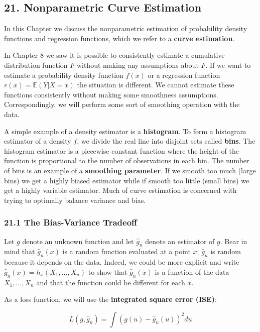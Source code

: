 \subsection{21. Nonparametric Curve Estimation}\label{nonparametric-curve-estimation}

In this Chapter we discuss the nonparametric estimation of probability
density functions and regression functions, which we refer to a
\textbf{curve estimation}.

In Chapter 8 we saw it is possible to consistently estimate a cumulative
distribution function \(F\) without making any assumptions about \(F\).
If we want to estimate a probability density function \(f(x)\) or a
regression function \(r(x) = \mathbb{E}(Y | X = x)\) the situation is
different. We cannot estimate these functions consistently without
making some smoothness assumptions. Correspondingly, we will perform
some sort of smoothing operation with the data.

A simple example of a density estimator is a \textbf{histogram}. To form
a histogram estimator of a density \(f\), we divide the real line into
disjoint sets called \textbf{bins}. The histogram estimator is a
piecewise constant function where the height of the function is
proportional to the number of observations in each bin. The number of
bins is an example of a \textbf{smoothing parameter}. If we smooth too
much (large bins) we get a highly biased estimator while if smooth too
little (small bins) we get a highly variable estimator. Much of curve
estimation is concerned with trying to optimally balance variance and
bias.

\subsubsection{21.1 The Bias-Variance Tradeoff}\label{the-bias-variance-tradeoff}

Let \(g\) denote an unknown function and let \(\hat{g}_n\) denote an
estimator of \(g\). Bear in mind that \(\hat{g}_n(x)\) is a random
function evaluated at a point \(x\); \(\hat{g}_n\) is random because it
depends on the data. Indeed, we could be more explicit and write
\(\hat{g}_n(x) = h_x(X_1, \dots, X_n)\) to show that \(\hat{g}_n(x)\) is
a function of the data \(X_1, \dots, X_n\) and that the function could
be different for each \(x\).

As a loss function, we will use the \textbf{integrated square error
(ISE)}:

\[ L(g, \hat{g}_n) = \int (g(u) - \hat{g}_n(u))^2 du\]

